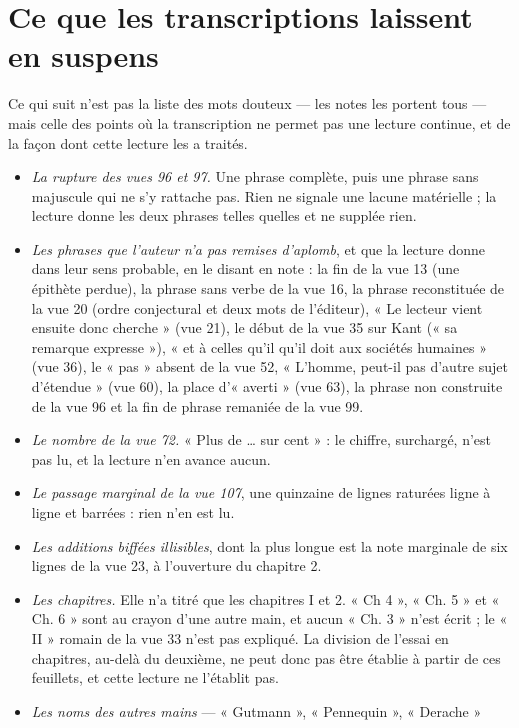\documentclass[11pt,a4paper]{article}
\begin{document}
\section*{Ce que les transcriptions laissent en suspens}

Ce qui suit n'est pas la liste des mots douteux — les notes les portent tous —
mais celle des points où la transcription ne permet pas une lecture continue, et
de la façon dont cette lecture les a traités.

\begin{itemize}
  \item \emph{La rupture des vues 96 et 97.} Une phrase complète, puis une phrase
    sans majuscule qui ne s'y rattache pas. Rien ne signale une lacune matérielle ;
    la lecture donne les deux phrases telles quelles et ne supplée rien.
  \item \emph{Les phrases que l'auteur n'a pas remises d'aplomb}, et que la lecture
    donne dans leur sens probable, en le disant en note : la fin de la vue 13 (une
    épithète perdue), la phrase sans verbe de la vue 16, la phrase reconstituée de
    la vue 20 (ordre conjectural et deux mots de l'éditeur), « Le lecteur vient
    ensuite donc cherche » (vue 21), le début de la vue 35 sur Kant (« sa remarque
    expresse »), « et à celles qu'il qu'il doit aux sociétés humaines » (vue 36),
    le « pas » absent de la vue 52, « L'homme, peut-il pas d'autre sujet d'étendue »
    (vue 60), la place d'« averti » (vue 63), la phrase non construite de la vue 96
    et la fin de phrase remaniée de la vue 99.
  \item \emph{Le nombre de la vue 72.} « Plus de … sur cent » : le chiffre,
    surchargé, n'est pas lu, et la lecture n'en avance aucun.
  \item \emph{Le passage marginal de la vue 107}, une quinzaine de lignes raturées
    ligne à ligne et barrées : rien n'en est lu.
  \item \emph{Les additions biffées illisibles}, dont la plus longue est la note
    marginale de six lignes de la vue 23, à l'ouverture du chapitre 2.
  \item \emph{Les chapitres.} Elle n'a titré que les chapitres I et 2. « Ch 4 »,
    « Ch. 5 » et « Ch. 6 » sont au crayon d'une autre main, et aucun « Ch. 3 »
    n'est écrit ; le « II » romain de la vue 33 n'est pas expliqué. La division de
    l'essai en chapitres, au-delà du deuxième, ne peut donc pas être établie à
    partir de ces feuillets, et cette lecture ne l'établit pas.
  \item \emph{Les noms des autres mains} — « Gutmann », « Pennequin », « Derache »

\end{itemize}
\end{document}
